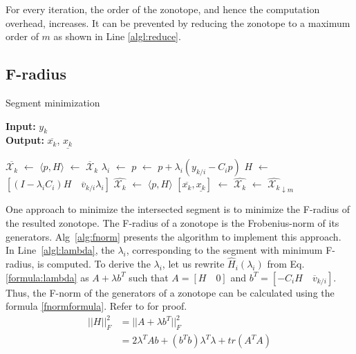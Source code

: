 For every iteration, the order of the zonotope, and hence the computation overhead, increases. It can be prevented by reducing the zonotope to a maximum order of $m$ as shown in Line \ref{algl:reduce}.

\subsection{F-radius}
\begin{algorithm}[H]
        \caption{Segment minimization}
        \textbf{Input:} $y_k$\\
 		\textbf{Output:} $\overline{x_k}$, $\underline{x_k}$
        \begin{algorithmic}[1]
        \State $\overline{\mathcal{X}_k}$ $\gets$ 
        \State $\langle p,H \rangle$ $\gets$ $\mathcal{\overline{X}}_k$
        	\State $\lambda_i$ $\gets$  \label{algl:lambda}
        	\State $p$ $\gets$ $p + \lambda_i (y_{k/i} - C_i p)$ \label{algl:center}
        	\State $H$ $\gets$ $[(I- \lambda_i C_i)H \quad \overline{v}_{k/i}\lambda_i]$  \label{algl:g}
        \EndFor
        \State $\hat{\mathcal{X}_k}$ $\gets$ $\langle p, H \rangle$
        \State $[\overline{x_k}, \underline{x_k}]$ $\gets$ 
        \State $\hat{\mathcal{X}_k}$ $\gets$ $\hat{\mathcal{X}_k}_{\downarrow m}$
        \end{algorithmic}
        \label{alg:fnorm}
\end{algorithm}
One approach to minimize the intersected segment is to minimize the F-radius of the resulted zonotope. The F-radius of a zonotope is the Frobenius-norm of its generators. Alg~\ref{alg:fnorm} presents the algorithm to implement this approach.\\
In Line~\ref{algl:lambda}, the $\lambda_i$, corresponding to the segment with minimum F-radius, is computed. To derive the $\lambda_i$, let us rewrite $\hat{H}_i(\lambda_i)$ from Eq. \ref{formula:lambda} as $A + \lambda b^T$ such that $A= [H \quad 0]$ and $b^T = [-C_i H \quad \overline{v}_{k/i}]$. Thus, the F-norm of the generators of a zonotope can be calculated using the formula \eqref{fnormformula}. Refer to \cite{Alamo2005} for proof.
\begin{equation}
\label{fnormformula}
\begin{split}
||H||_{F}^2 & = ||A + \lambda b^T||^{2}_F \\
&= 2\lambda^T A b+ (b^Tb)\lambda^T\lambda + tr(A^TA)
\end{split}
\end{equation}

